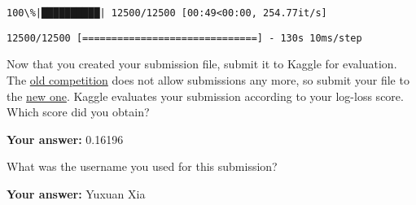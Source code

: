 \documentclass[11pt]{article}
\begin{document}
    \begin{Verbatim}[commandchars=\\\{\}]
100\%|██████████| 12500/12500 [00:49<00:00, 254.77it/s]

    \end{Verbatim}

    \begin{Verbatim}[commandchars=\\\{\}]
12500/12500 [==============================] - 130s 10ms/step

    \end{Verbatim}

    Now that you created your submission file, submit it to Kaggle for
evaluation. The \href{https://www.kaggle.com/c/dogs-vs-cats}{old
competition} does not allow submissions any more, so submit your file to
the
\href{https://www.kaggle.com/c/dogs-vs-cats-redux-kernels-edition}{new
one}. Kaggle evaluates your submission according to your log-loss score.
Which score did you obtain?

    \textbf{Your answer:} 0.16196

    What was the username you used for this submission?

    \textbf{Your answer:} Yuxuan Xia


    
    
    
    
\end{document}

